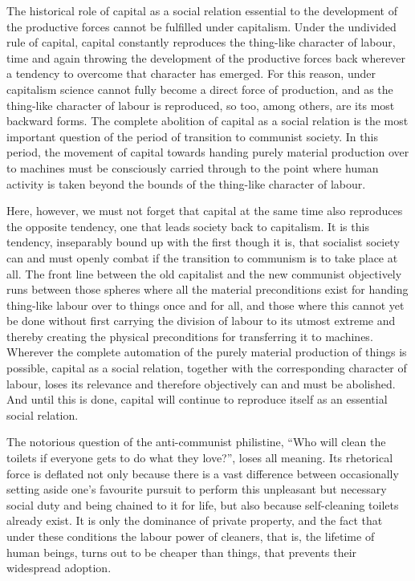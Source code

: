 \documentclass[../main]{subfiles}
\begin{document}
The historical role of capital as a social relation essential to the development of the productive forces cannot be fulfilled under capitalism. Under the undivided rule of capital, capital constantly reproduces the thing-like character of labour, time and again throwing the development of the productive forces back wherever a tendency to overcome that character has emerged. For this reason, under capitalism science cannot fully become a direct force of production, and as the thing-like character of labour is reproduced, so too, among others, are its most backward forms. The complete abolition of capital as a social relation is the most important question of the period of transition to communist society. In this period, the movement of capital towards handing purely material production over to machines must be consciously carried through to the point where human activity is taken beyond the bounds of the thing-like character of labour.

Here, however, we must not forget that capital at the same time also reproduces the opposite tendency, one that leads society back to capitalism. It is this tendency, inseparably bound up with the first though it is, that socialist society can and must openly combat if the transition to communism is to take place at all. The front line between the old capitalist and the new communist objectively runs between those spheres where all the material preconditions exist for handing thing-like labour over to things once and for all, and those where this cannot yet be done without first carrying the division of labour to its utmost extreme and thereby creating the physical preconditions for transferring it to machines. Wherever the complete automation of the purely material production of things is possible, capital as a social relation, together with the corresponding character of labour, loses its relevance and therefore objectively can and must be abolished. And until this is done, capital will continue to reproduce itself as an essential social relation.

The notorious question of the anti-communist philistine, “Who will clean the toilets if everyone gets to do what they love?”, loses all meaning. Its rhetorical force is deflated not only because there is a vast difference between occasionally setting aside one’s favourite pursuit to perform this unpleasant but necessary social duty and being chained to it for life, but also because self-cleaning toilets already exist. It is only the dominance of private property, and the fact that under these conditions the labour power of cleaners, that is, the lifetime of human beings, turns out to be cheaper than things, that prevents their widespread adoption.
\end{document}
